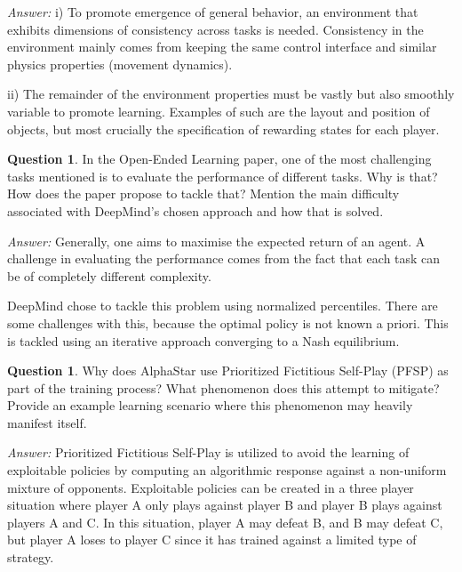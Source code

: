 \documentclass{article}
\theoremstyle{definition}
\newtheorem{question}[thm]{Question}
\newenvironment{answer}{\noindent\textit{Answer:}}{}
\begin{document}
\begin{answer}
i) To promote emergence of general behavior, an environment that exhibits dimensions of consistency across tasks is needed. Consistency in the environment mainly comes from keeping the same control interface and similar physics properties (movement dynamics).

ii) The remainder of the environment properties must be vastly but also smoothly variable to promote learning. Examples of such are the layout and position  of objects, but most crucially the specification of rewarding states for each player. \\
\end{answer}


\begin{question}
In the Open-Ended Learning paper, one of the most challenging tasks mentioned is to evaluate the performance of different tasks. Why is that? How does the paper propose to tackle that? Mention the main difficulty associated with DeepMind's chosen approach and how that is solved.
\end{question}

\begin{answer}
Generally, one aims to maximise the expected return of an agent. A challenge in evaluating the performance comes from the fact that each task can be of completely different complexity.

DeepMind chose to tackle this problem using normalized percentiles. There are some challenges with this, because the optimal policy is not known a priori. This is tackled using an iterative approach converging to a Nash equilibrium. 
\end{answer}

\begin{question}
Why does AlphaStar use Prioritized Fictitious Self-Play (PFSP) as part of the training process? What phenomenon does this attempt to mitigate? Provide an example learning scenario where this phenomenon may heavily manifest itself. 
\end{question}

\begin{answer}
Prioritized Fictitious Self-Play is utilized to avoid the learning of exploitable policies by computing an algorithmic response against a non-uniform mixture of opponents. Exploitable policies can be created in a three player situation where player A only plays against player B and player B plays against players A and C. In this situation, player A may defeat B, and B may defeat C, but player A loses to player C since it has trained against a limited type of strategy. 
\end{answer}
\end{document}
